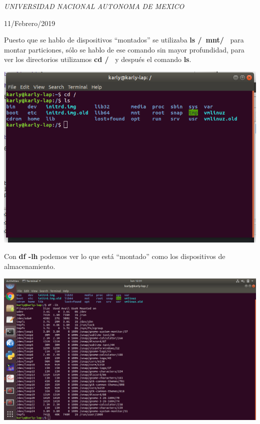 \documentclass[a4paper, 11pt, oneside]{article}
\begin{document}
\begin{titlepage}
	\textit{UNIVERSIDAD NACIONAL AUTONOMA DE MEXICO} 
	
	\vfill
	
	
	
	
	\vspace{0.3\baselineskip} 
	
	11/Febrero/2019 
	
	 

\end{titlepage}

Puesto que se hablo de dispositivos ``montados'' se utilizaba \textbf{ls /\ mnt/\ } para montar particiones, sólo se hablo de ese comando sin mayor profundidad, para ver los directorios utilizamos \textbf{cd /\ } y después el comando \textbf{ls}.
\begin{center}
\includegraphics[scale=0.35]{11102.png} 
\end{center}

Con \textbf{df -lh} podemos ver lo que está ``montado'' como los dispositivos de almacenamiento.

\begin{center}
 \includegraphics[scale=0.20]{21102.png}
\end{center}
\end{document}
